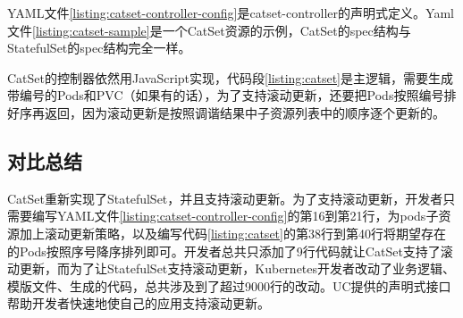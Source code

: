 \documentclass[macfonts,master]{njuthesis}
\begin{document}
YAML文件\ref{listing:catset-controller-config}是catset-controller的声明式定义。Yaml文件\ref{listing:catset-sample}是一个CatSet资源的示例，CatSet的spec结构与StatefulSet的spec结构完全一样。

CatSet的控制器依然用JavaScript实现，代码段\ref{listing:catset}是主逻辑，需要生成带编号的Pods和PVC（如果有的话），为了支持滚动更新，还要把Pods按照编号排好序再返回，因为滚动更新是按照调谐结果中子资源列表中的顺序逐个更新的。

\subsection{对比总结}
CatSet重新实现了StatefulSet，并且支持滚动更新。为了支持滚动更新，开发者只需要编写YAML文件\ref{listing:catset-controller-config}的第16到第21行，为pods子资源加上滚动更新策略，以及编写代码\ref{listing:catset}的第38行到第40行将期望存在的Pods按照序号降序排列即可。开发者总共只添加了9行代码就让CatSet支持了滚动更新，而为了让StatefulSet支持滚动更新，Kubernetes开发者改动了业务逻辑、模版文件、生成的代码，总共涉及到了超过9000行的改动\cite{statefulsetupdate}。UC提供的声明式接口帮助开发者快速地使自己的应用支持滚动更新。

%
%
%
%
%
\end{document}
